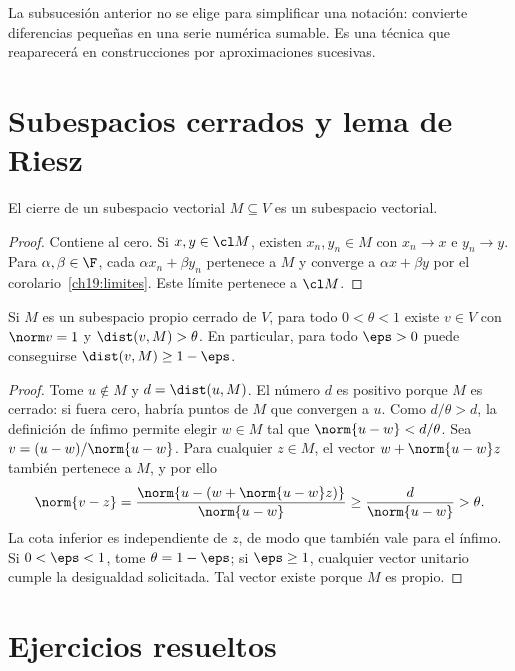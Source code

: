 La subsucesión anterior no se elige para simplificar una notación: convierte diferencias pequeñas en una serie numérica sumable. Es una técnica que reaparecerá en construcciones por aproximaciones sucesivas.

\section{Subespacios cerrados y lema de Riesz}

\begin{proposicion}\label{ch19:cierre-subespacio}
El cierre de un subespacio vectorial $M\subseteq V$ es un subespacio vectorial.
\end{proposicion}
\begin{proof}
Contiene al cero. Si $x,y\in\cl M$, existen $x_n,y_n\in M$ con $x_n\to x$ e $y_n\to y$. Para $\alpha,\beta\in\F$, cada $\alpha x_n+\beta y_n$ pertenece a $M$ y converge a $\alpha x+\beta y$ por el corolario~\ref{ch19:limites}. Este límite pertenece a $\cl M$.
\end{proof}

\begin{lema}[Riesz]\label{ch19:riesz}
Si $M$ es un subespacio propio cerrado de $V$, para todo $0<\theta<1$ existe $v\in V$ con $\norm v=1$ y $\dist(v,M)>\theta$. En particular, para todo $\eps>0$ puede conseguirse $\dist(v,M)\geq1-\eps$.
\end{lema}
\begin{proof}
Tome $u\notin M$ y $d=\dist(u,M)$. El número $d$ es positivo porque $M$ es cerrado: si fuera cero, habría puntos de $M$ que convergen a $u$. Como $d/\theta>d$, la definición de ínfimo permite elegir $w\in M$ tal que $\norm{u-w}<d/\theta$. Sea $v=(u-w)/\norm{u-w}$. Para cualquier $z\in M$, el vector $w+\norm{u-w}z$ también pertenece a $M$, y por ello
\[
 \norm{v-z}
 =\frac{\norm{u-(w+\norm{u-w}z)}}{\norm{u-w}}
 \geq\frac d{\norm{u-w}}>\theta.
\]
La cota inferior es independiente de $z$, de modo que también vale para el ínfimo. Si $0<\eps<1$, tome $\theta=1-\eps$; si $\eps\geq1$, cualquier vector unitario cumple la desigualdad solicitada. Tal vector existe porque $M$ es propio.
\end{proof}

\section{Ejercicios resueltos}

